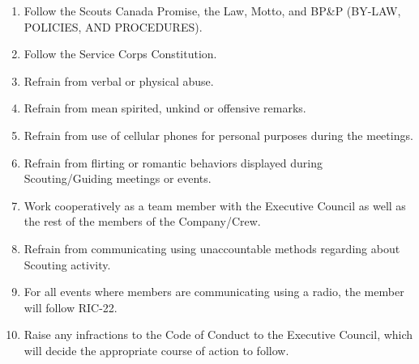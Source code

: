 \documentclass{Service_Corps_Document}
\begin{document}
\def \Title {Code of Conduct}
\def \Company {Service Corps}
\def \versionNumber {3.0}
\stdFooter
\begin{titlepage}
	\stdTitlePage
\end{titlepage}
\begin{enumerate}
	\item Follow the Scouts Canada Promise, the Law, Motto, and BP\&P (BY-LAW, POLICIES, AND PROCEDURES).
	\item Follow the Service Corps Constitution.
	\item Refrain from verbal or physical abuse.
	\item Refrain from mean spirited, unkind or offensive remarks.
	\item Refrain from use of cellular phones for personal purposes during the meetings.
	\item Refrain from flirting or romantic behaviors displayed during Scouting/Guiding meetings or events.
	\item Work cooperatively as a team member with the Executive Council as well as the rest of the members of the Company/Crew.
	\item Refrain from communicating using unaccountable methods regarding about Scouting activity.
	\item For all events where members are communicating using a radio, the member will follow RIC-22.
	\item Raise any infractions to the Code of Conduct to the Executive Council, which will decide the appropriate course of action to follow.
	      		
\end{enumerate}
\end{document}
